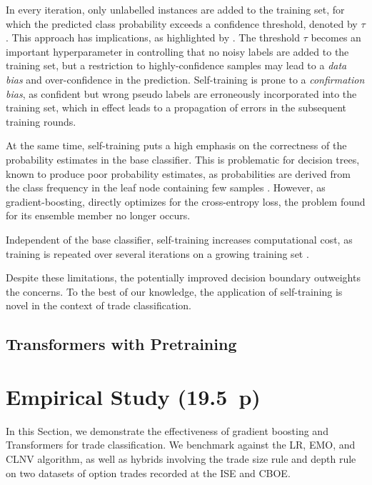 In every iteration, only unlabelled instances are added to the training set, for which the predicted class probability exceeds a confidence threshold, denoted by $\tau$. This approach has implications, as highlighted by \textcite[][2]{chenDebiasedSelfTrainingSemiSupervised2022}. The threshold $\tau$ becomes an important hyperparameter in controlling that no noisy labels are added to the training set, but a restriction to highly-confidence samples may lead to a \emph{data bias} and over-confidence in the prediction. Self-training is prone to a \emph{confirmation bias}, as confident but wrong pseudo labels are erroneously incorporated into the training set, which in effect leads to a propagation of errors in the subsequent training rounds.

At the same time, self-training puts a high emphasis on the correctness of the probability estimates in the base classifier. This is problematic for decision trees, known to produce poor probability estimates, as probabilities are derived from the class frequency in the leaf node containing few samples \autocite[][357--358]{tanhaSemisupervisedSelftrainingDecision2017}. However, as gradient-boosting, directly optimizes for the cross-entropy loss, the problem found for its ensemble member no longer occurs.

Independent of the base classifier, self-training increases computational cost, as training is repeated over several iterations on a growing training set \autocite[][9]{zophRethinkingPretrainingSelftraining2020}.

Despite these limitations, the potentially improved decision boundary outweights the concerns. To the best of our knowledge, the application of self-training is novel in the context of trade classification.

\subsection{Transformers with Pretraining}\label{sec:extensions-to-transformer}


\newpage
{}
\section{Empirical Study (19.5~p)}\label{sec:empirical-study}

In this Section, we demonstrate the effectiveness of gradient boosting and Transformers for trade classification. We benchmark against the \gls{LR}, \gls{EMO}, and \gls{CLNV} algorithm, as well as hybrids involving the trade size rule and depth rule on two datasets of option trades recorded at the \gls{ISE} and \gls{CBOE}.


